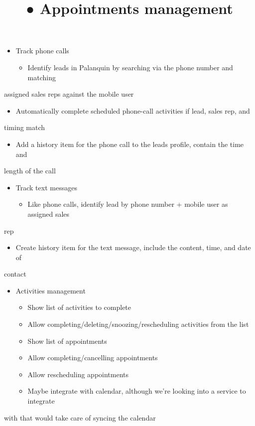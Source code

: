 \documentclass[11pt,a4paper]{article}
\begin{document}
\begin{itemize}
\item Track phone calls
\begin{itemize}
\item Identify leads in Palanquin by searching via the phone number and matching
\end{itemize}
\end{itemize}
assigned sales reps against the mobile user

\begin{itemize}
\item Automatically complete scheduled phone-call activities if lead, sales rep, and
\end{itemize}
timing match

\begin{itemize}
\item Add a history item for the phone call to the leads profile, contain the time and
\end{itemize}
length of the call

\begin{itemize}
\item Track text messages
\begin{itemize}
\item Like phone calls, identify lead by phone number + mobile user as assigned sales
\end{itemize}
\end{itemize}
rep

\begin{itemize}
\item Create history item for the text message, include the content, time, and date of
\end{itemize}
contact

\begin{itemize}
\item Activities management
\begin{itemize}
\item Show list of activities to complete
\item Allow completing/deleting/snoozing/rescheduling activities from the list
\title{● Appointments management}
\maketitle

\item Show list of appointments
\item Allow completing/cancelling appointments
\item Allow rescheduling appointments
\item Maybe integrate with calendar, although we’re looking into a service to integrate
\end{itemize}
\end{itemize}
with that would take care of syncing the calendar
\end{document}
